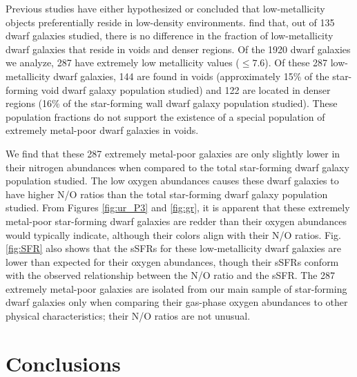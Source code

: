 Previous studies have either hypothesized \citep{Pustilnik06,Pustilnik11b,
Pustilnik13} or concluded \citep{Filho15} that low-metallicity objects 
preferentially reside in low-density environments.  \cite{Douglass17a} find 
that, out of 135 dwarf galaxies studied, there is no difference in the fraction 
of low-metallicity dwarf galaxies that reside in voids and denser regions.  Of 
the 1920 dwarf galaxies we analyze, 287 have extremely low metallicity values 
(\OH $\leq 7.6$).  Of these 287 low-metallicity dwarf galaxies, 144 are found in 
voids (approximately 15\% of the star-forming void dwarf galaxy population 
studied) and 122 are located in denser regions (16\% of the star-forming wall 
dwarf galaxy population studied).  These population fractions do not support the 
existence of a special population of extremely metal-poor dwarf galaxies in 
voids.

We find that these 287 extremely metal-poor galaxies are only slightly lower in 
their nitrogen abundances when compared to the total star-forming dwarf galaxy 
population studied.  The low oxygen abundances causes these dwarf galaxies to 
have higher N/O ratios than the total star-forming dwarf galaxy population 
studied.  From Figures \ref{fig:ur_P3} and \ref{fig:gr}, it is apparent that 
these extremely metal-poor star-forming dwarf galaxies are redder than their 
oxygen abundances would typically indicate, although their colors align with 
their N/O ratios.  Fig. \ref{fig:SFR} also shows that the sSFRs for these 
low-metallicity dwarf galaxies are lower than expected for their oxygen 
abundances, though their sSFRs conform with the observed relationship between 
the N/O ratio and the sSFR.  The 287 extremely metal-poor galaxies are isolated 
from our main sample of star-forming dwarf galaxies only when comparing their 
gas-phase oxygen abundances to other physical characteristics; their N/O ratios 
are not unusual.


%
%
\section{Conclusions}

